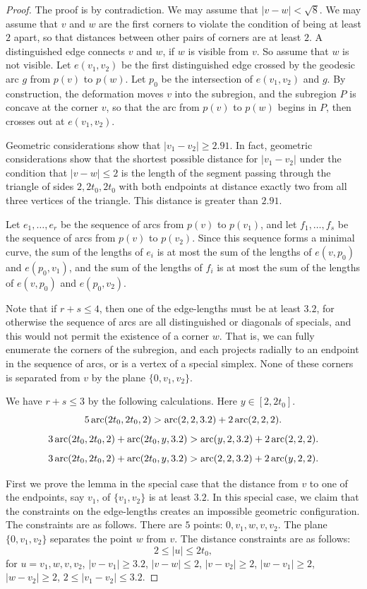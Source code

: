 \begin{proof}
The proof is by contradiction. We may assume that $|v-w|<\sqrt8$.
We may assume that $v$ and $w$ are the first corners to violate
the condition of being at least $2$ apart, so that distances
between other pairs of corners are at least $2$.  A distinguished
edge connects $v$ and $w$, if $w$ is visible from $v$. So assume
that $w$ is not visible.  Let $e(v_1,v_2)$ be the first
distinguished edge crossed by the geodesic arc $g$ from $p(v)$ to
$p(w)$. Let $p_0$ be the intersection of $e(v_1,v_2)$ and $g$. By
construction, the deformation moves $v$ into the subregion, and
the subregion $P$ is concave at the corner $v$, so that the arc
from $p(v)$ to $p(w)$ begins in $P$, then crosses out at
$e(v_1,v_2)$.

Geometric considerations show that $|v_1-v_2|\ge2.91$.  In fact,
geometric considerations show that the shortest possible distance
for $|v_1-v_2|$ under the condition that $|v-w|\le2$ is the length
of the segment passing through the triangle of sides $2,2t_0,2t_0$
with both endpoints at distance exactly two from all three
vertices of the triangle.  This distance is greater than $2.91$.

Let $e_1,\ldots,e_r$ be the sequence of arcs from $p(v)$ to
$p(v_1)$, and let $f_1,\ldots,f_s$ be the sequence of arcs from
$p(v)$ to $p(v_2)$. Since this sequence forms a minimal curve, the
sum of the lengths of $e_i$ is at most the sum of the lengths of
$e(v,p_0)$ and $e(p_0,v_1)$, and the sum of the lengths of $f_i$
is at most the sum of the lengths of $e(v,p_0)$ and $e(p_0,v_2)$.

Note that if $r+s\le4$, then one of the edge-lengths must be at
least $3.2$, for otherwise the sequence of arcs are all
distinguished or diagonals of specials, and this would not permit
the existence of a corner $w$. That is, we can fully enumerate the
corners of the subregion, and each projects radially to an
endpoint in the sequence of arcs, or is a vertex of a special
simplex. None of these corners is separated from $v$ by the plane
$\{0,v_1,v_2\}$.

We have $r+s\le3$ by the following calculations.  Here
$y\in[2,2t_0]$.
    $$5\operatorname{arc}(2t_0,2t_0,2) > \operatorname{arc}(2,2,3.2)+ 2 \operatorname{arc}(2,2,2).$$
    $$3\operatorname{arc}(2t_0,2t_0,2) + \operatorname{arc}(2t_0,y,3.2) > \operatorname{arc}(y,2,3.2) + 2 \operatorname{arc}(2,2,2).$$
    $$3\operatorname{arc}(2t_0,2t_0,2) + \operatorname{arc}(2t_0,y,3.2) > \operatorname{arc}(2,2,3.2) + 2\operatorname{arc}(y,2,2).$$


First we prove the lemma in the special case that the distance
from $v$ to one of the endpoints, say $v_1$, of $\{v_1,v_2\}$ is at
least $3.2$. In this special case, we claim that the constraints
on the edge-lengths creates an impossible geometric configuration.
The constraints are as follows.  There are $5$ points:
$0,v_1,w,v,v_2$. The plane $\{0,v_1,v_2\}$ separates the point $w$
from $v$. The distance constraints are as follows:
    $$2\le |u| \le 2t_0,$$
for $u=v_1,w,v,v_2$, $|v-v_1|\ge 3.2$, $|v-w|\le2$, $|v-v_2|\ge2$,
$|w-v_1|\ge2$, $|w-v_2|\ge2$, $2\le |v_1-v_2|\le 3.2$.


\end{proof}
